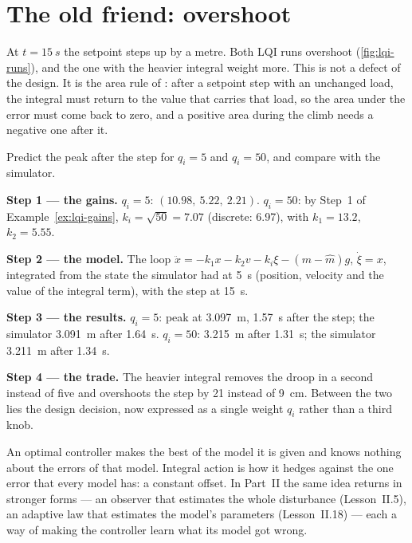 \section{The old friend: overshoot}

At $t = \SI{15}{s}$ the setpoint steps up by a metre. Both LQI runs overshoot (\cref{fig:lqi-runs}), and the one with the heavier integral weight more. This is not a defect of the design. It is the area rule of : after a setpoint step with an unchanged load, the integral must return to the value that carries that load, so the area under the error must come back to zero, and a positive area during the climb needs a negative one after it.

\begin{example}
\label{ex:lqi-step}
Predict the peak after the step for $q_i = 5$ and $q_i = 50$, and compare with the simulator.

\textbf{Step 1 — the gains.} $q_i = 5$: $(10.98,\ 5.22,\ 2.21)$. $q_i = 50$: by Step~1 of Example~\ref{ex:lqi-gains}, $k_i = \sqrt{50} = 7.07$ (discrete: 6.97), with $k_1 = 13.2$, $k_2 = 5.55$.

\textbf{Step 2 — the model.} The loop $\ddot x = -k_1x - k_2v - k_i\xi - (m - \hat m)g$, $\dot\xi = x$, integrated from the state the simulator had at \SI{5}{s} (position, velocity and the value of the integral term), with the step at \SI{15}{s}.

\textbf{Step 3 — the results.} $q_i = 5$: peak at \SI{3.097}{m}, \SI{1.57}{s} after the step; the simulator \SI{3.091}{m} after \SI{1.64}{s}. $q_i = 50$: \SI{3.215}{m} after \SI{1.31}{s}; the simulator \SI{3.211}{m} after \SI{1.34}{s}.

\textbf{Step 4 — the trade.} The heavier integral removes the droop in a second instead of five and overshoots the step by 21 instead of \SI{9}{cm}. Between the two lies the design decision, now expressed as a single weight $q_i$ rather than a third knob.
\end{example}

\begin{keyidea}
An optimal controller makes the best of the model it is given and knows nothing about the errors of that model. Integral action is how it hedges against the one error that every model has: a constant offset. In Part~II the same idea returns in stronger forms — an observer that estimates the whole disturbance (Lesson~II.5), an adaptive law that estimates the model's parameters (Lesson~II.18) — each a way of making the controller learn what its model got wrong.
\end{keyidea}


